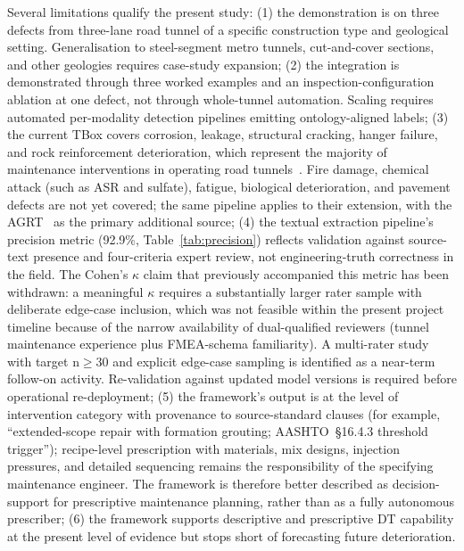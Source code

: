 \documentclass[11pt,a4paper]{article}
\begin{document}
Several limitations qualify the present study: (1) the demonstration is on three defects from three-lane road tunnel of a specific construction type and geological setting. Generalisation to steel-segment metro tunnels, cut-and-cover sections, and other geologies requires case-study expansion; (2) the integration is demonstrated through three worked examples and an inspection-configuration ablation at one defect, not through whole-tunnel automation. Scaling requires automated per-modality detection pipelines emitting ontology-aligned labels; (3) the current TBox covers corrosion, leakage, structural cracking, hanger failure, and rock reinforcement deterioration, which represent the majority of maintenance interventions in operating road tunnels~\citep{AASHTO2009}. Fire damage, chemical attack (such as ASR and sulfate), fatigue, biological deterioration, and pavement defects are not yet covered; the same pipeline applies to their extension, with the AGRT~\citep{Austroads2024} as the primary additional source; (4) the textual extraction pipeline's precision metric (92.9\%, Table~\ref{tab:precision}) reflects validation against source-text presence and four-criteria expert review, not engineering-truth correctness in the field. The Cohen's $\kappa$ claim that previously accompanied this metric has been withdrawn: a meaningful $\kappa$ requires a substantially larger rater sample with deliberate edge-case inclusion, which was not feasible within the present project timeline because of the narrow availability of dual-qualified reviewers (tunnel maintenance experience plus FMEA-schema familiarity). A multi-rater study with target n$\geq$30 and explicit edge-case sampling is identified as a near-term follow-on activity. Re-validation against updated model versions is required before operational re-deployment; (5) the framework's output is at the level of intervention category with provenance to source-standard clauses (for example, ``extended-scope repair with formation grouting; AASHTO~\S16.4.3 threshold trigger''); recipe-level prescription with materials, mix designs, injection pressures, and detailed sequencing remains the responsibility of the specifying maintenance engineer. The framework is therefore better described as decision-support for prescriptive maintenance planning, rather than as a fully autonomous prescriber; (6) the framework supports descriptive and prescriptive DT capability at the present level of evidence but stops short of forecasting future deterioration.
\end{document}

